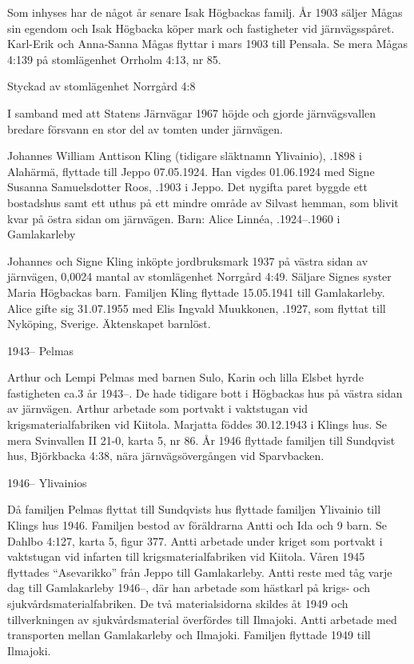 Som inhyses har de något år senare Isak Högbackas familj. År 1903 säljer Mågas sin egendom och Isak Högbacka köper mark och fastigheter vid järnvägsspåret. Karl-Erik och Anna-Sanna Mågas flyttar i mars 1903 till Pensala. Se mera Mågas 4:139	på stomlägenhet Orrholm 4:13, nr 85.



Styckad av stomlägenhet Norrgård 4:8


I samband med att Statens Järnvägar 1967  höjde och gjorde 	järnvägsvallen bredare försvann en stor del av tomten under järnvägen.\jhvspace{}



Johannes William Anttison Kling (tidigare släktnamn Ylivainio), .1898 i Alahärmä, flyttade till Jeppo 07.05.1924. Han vigdes 01.06.1924 med Signe Susanna Samuelsdotter Roos, .1903 i Jeppo. Det nygifta paret byggde ett bostadshus samt ett uthus 	på ett mindre område av Silvast hemman, som blivit kvar på östra sidan om järnvägen.
Barn: Alice Linnéa, .1924--.1960 i Gamlakarleby

Johannes och Signe Kling inköpte jordbruksmark 1937 på västra sidan av	järnvägen, 0,0024 mantal av stomlägenhet Norrgård 4:49. Säljare Signes syster Maria Högbackas barn.	Familjen Kling flyttade 15.05.1941 till Gamlakarleby. Alice gifte sig 31.07.1955 med Elis Ingvald Muukkonen, .1927, som flyttat till Nyköping, Sverige. Äktenskapet barnlöst.


1943--	Pelmas

Arthur och Lempi Pelmas med barnen Sulo, Karin och lilla Elsbet hyrde fastigheten ca.3 år 1943--. De hade tidigare bott i Högbackas hus på västra sidan av järnvägen. Arthur arbetade som portvakt i vaktstugan vid 	krigsmaterialfabriken vid Kiitola. Marjatta föddes 30.12.1943 i Klings hus. Se mera Svinvallen II 21-0, karta 5, nr 86. År 1946 flyttade familjen till Sundqvist hus, Björkbacka 4:38, nära järnvägsövergången vid Sparvbacken.

1946--	Ylivainios

Då familjen Pelmas flyttat till Sundqvists hus flyttade familjen Ylivainio till Klings hus 1946. Familjen bestod av föräldrarna Antti och Ida och 9 barn. Se Dahlbo 4:127, karta 5, figur 377. Antti arbetade under kriget som portvakt i vaktstugan vid infarten till krigsmaterialfabriken vid Kiitola. Våren 1945 flyttades ``Asevarikko'' från Jeppo till Gamlakarleby. Antti reste med tåg varje dag till Gamlakarleby 1946--, där han arbetade som hästkarl på krigs- och sjukvårdsmaterialfabriken. De två materialsidorna skildes åt 1949 och tillverkningen av sjukvårdsmaterial överfördes till Ilmajoki. Antti arbetade med transporten mellan Gamlakarleby och Ilmajoki. Familjen flyttade 1949 till Ilmajoki.

